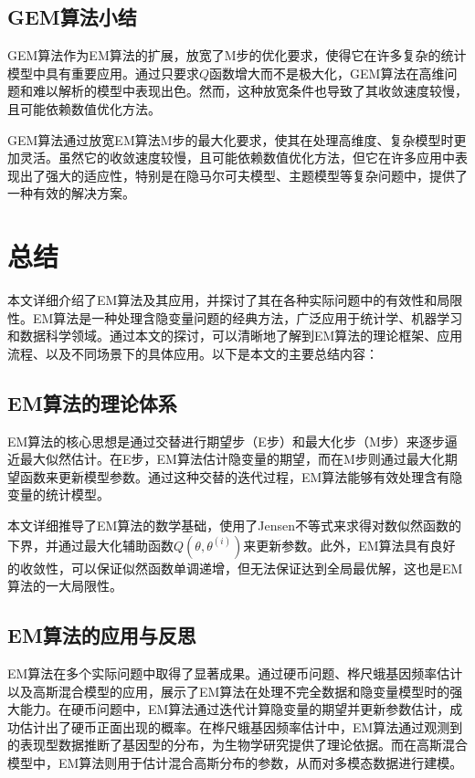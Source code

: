 \documentclass[a4paper,12pt]{ctexart} %
\begin{document}
\subsection{GEM算法小结}

GEM算法作为EM算法的扩展，放宽了M步的优化要求，使得它在许多复杂的统计模型中具有重要应用。通过只要求$Q$函数增大而不是极大化，GEM算法在高维问题和难以解析的模型中表现出色。然而，这种放宽条件也导致了其收敛速度较慢，且可能依赖数值优化方法。

\begin{learnbox}{\kaishu
GEM算法通过放宽EM算法M步的最大化要求，使其在处理高维度、复杂模型时更加灵活。虽然它的收敛速度较慢，且可能依赖数值优化方法，但它在许多应用中表现出了强大的适应性，特别是在隐马尔可夫模型、主题模型等复杂问题中，提供了一种有效的解决方案。}
\end{learnbox}

\section{总结}

本文详细介绍了EM算法及其应用，并探讨了其在各种实际问题中的有效性和局限性。EM算法是一种处理含隐变量问题的经典方法，广泛应用于统计学、机器学习和数据科学领域。通过本文的探讨，可以清晰地了解到EM算法的理论框架、应用流程、以及不同场景下的具体应用。以下是本文的主要总结内容：

\subsection{EM算法的理论体系}

EM算法的核心思想是通过交替进行期望步（E步）和最大化步（M步）来逐步逼近最大似然估计。在E步，EM算法估计隐变量的期望，而在M步则通过最大化期望函数来更新模型参数。通过这种交替的迭代过程，EM算法能够有效处理含有隐变量的统计模型。

本文详细推导了EM算法的数学基础，使用了Jensen不等式来求得对数似然函数的下界，并通过最大化辅助函数$Q(\theta, \theta^{(i)})$来更新参数。此外，EM算法具有良好的收敛性，可以保证似然函数单调递增，但无法保证达到全局最优解，这也是EM算法的一大局限性。

\subsection{EM算法的应用与反思}

EM算法在多个实际问题中取得了显著成果。通过硬币问题、桦尺蛾基因频率估计以及高斯混合模型的应用，展示了EM算法在处理不完全数据和隐变量模型时的强大能力。在硬币问题中，EM算法通过迭代计算隐变量的期望并更新参数估计，成功估计出了硬币正面出现的概率。在桦尺蛾基因频率估计中，EM算法通过观测到的表现型数据推断了基因型的分布，为生物学研究提供了理论依据。而在高斯混合模型中，EM算法则用于估计混合高斯分布的参数，从而对多模态数据进行建模。
\end{document}
